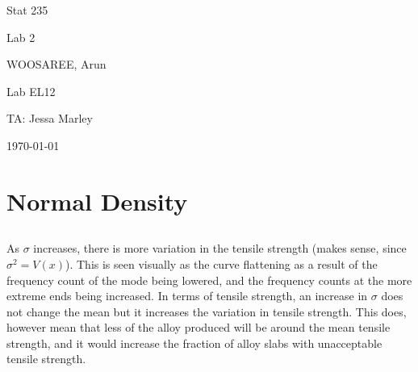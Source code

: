 \documentclass[letterpaper]{article}
\begin{document}
\begin{titlepage}
 \begin{center}
  \vspace*{1cm}
  \Huge
  Stat 235
  \vspace{1cm}
  
  Lab 2
  \vspace{1cm}
  
  WOOSAREE, Arun
  \vspace{1cm}
  
  \Huge
  Lab EL12
  \vspace{1cm}
  
  TA: Jessa Marley
  \vspace{1cm}
  
  \today
  \vfill
 \end{center}
\end{titlepage}

\section{Normal Density}

\subsection{}%



As $\sigma$ increases, there is more variation in the tensile strength (makes
sense, since $\sigma^2=V(x)$). This is seen visually as the curve flattening as
a result of the frequency count of the mode being lowered, and the frequency
counts at the more extreme ends being increased. In terms of tensile strength,
an increase in $\sigma$ does not change the mean but it increases the variation
in tensile strength. This does, however mean that less of the alloy produced
will be around the mean tensile strength, and it would increase the fraction of
alloy slabs with unacceptable tensile strength.

\subsection{}%
\end{document}
